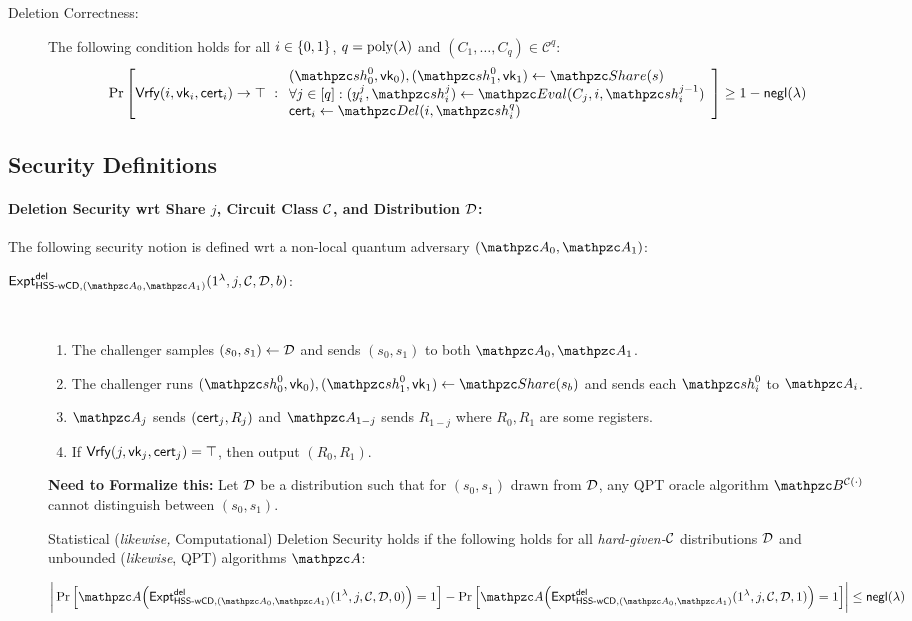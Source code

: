 \begin{description}
\item [Deletion Correctness:] The following condition holds for
all $i \in \{0,1\}$, $q = {\mathrm{poly}}(\lambda)$ and $(C_1, \ldots, C_q) \in
\mathcal{C}^q:$
\begin{align}
\Pr\left[
\Vrfy(i, \vk_i, \cert_i) \rightarrow \top
\ :
\begin{array}{ll}
(\qsh_0^0, \vk_0), (\qsh_1^0, \vk_1) \gets \Sh(s)\\
\forall j \in [q]: (y_i^j, \qsh_i^j) \leftarrow \Ev(C_j, i,
\qsh_i^{j-1})\\
\cert_i \leftarrow \Del(i, \qsh_i^q)
\end{array}
\right] \geq 1 - \negl(\secp)
\end{align}
\end{description}

\subsection{Security Definitions}

\paragraph{Deletion Security wrt Share
$j$, Circuit Class $\mathcal{C}$, and Distribution $\mathcal{D}$:}
The following security notion is defined wrt a non-local quantum
adversary $(\qA_0, \qA_1)$:

\begin{description}
\item [$\expa{\HSSwcd, (\qA_0, \qA_1)}{del}(1^\secp, j, \calC,
\calD, b)$:] $ $
\begin{enumerate}
\item The challenger samples $(s_0, s_1) \leftarrow \mathcal{D}$ and
sends $(s_0, s_1)$ to both $\qA_0, \qA_1$.
\item 
The challenger runs
$(\qsh_0^0, \vk_0), (\qsh_1^0, \vk_1) \gets \Sh(s_b)$ and sends each
$\qsh_i^0$ to $\qA_i$.

\item $\qA_j$ sends $(\mathsf{cert}_j, R_j)$ and $\qA_{1-j}$ sends $R_{1-j}$
where $R_0, R_1$ are some registers.
\item If $\mathsf{Vrfy}(j, \mathsf{vk}_j, \mathsf{cert}_j) = \top$, then output $(R_0,
R_1)$.
\end{enumerate}

\textbf{Need to Formalize this:} Let $\mathcal{D}$ be a distribution such
that for $(s_0, s_1)$ drawn from $\mathcal{D}$, any QPT oracle algorithm
$\qB^{\calC(\cdot)}$ cannot distinguish between $(s_0, s_1)$.

Statistical (\emph{likewise,} Computational) Deletion Security holds
if the
following holds for all \emph{hard-given-$\mathcal{C}$} distributions
$\mathcal{D}$ and unbounded (\emph{likewise}, QPT) algorithms $\qA$:

$$\bigg\lvert \Pr\Big[\qA\Big(\expa{\HSSwcd, (\qA_0,
\qA_1)}{del}(1^\secp, j, \calC, \calD, 0)\Big)=1\Big] -
\Pr\Big[\qA\Big(\expa{\HSSwcd, (\qA_0,
\qA_1)}{del}(1^\secp, j, \calC, \calD, 1)\Big)=1\Big]
\bigg\rvert \le \negl(\secp)$$
\end{description}

